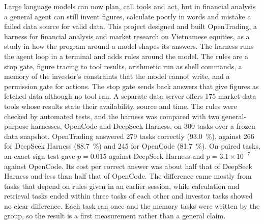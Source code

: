 Large language models can now plan, call tools and act, but in financial analysis a general agent can still invent figures, calculate poorly in words and mistake a failed data source for valid data.
This project designed and built OpenTrading, a harness for financial analysis and market research on Vietnamese equities, as a study in how the program around a model shapes its answers.
The harness runs the agent loop in a terminal and adds rules around the model.
The rules are a stop gate, figure tracing to tool results, arithmetic run as shell commands, a memory of the investor's constraints that the model cannot write, and a permission gate for actions.
The stop gate sends back answers that give figures as fetched data although no tool ran.
A separate data server offers 175 market-data tools whose results state their availability, source and time.
The rules were checked by automated tests, and the harness was compared with two general-purpose harnesses, OpenCode and DeepSeek Harness, on 300 tasks over a frozen data snapshot.
OpenTrading answered 279 tasks correctly (\qty{93.0}{\percent}), against 266 for DeepSeek Harness (\qty{88.7}{\percent}) and 245 for OpenCode (\qty{81.7}{\percent}).
On paired tasks, an exact sign test gave $p=0.015$ against DeepSeek Harness and $p=3.1\times10^{-7}$ against OpenCode.
Its cost per correct answer was about half that of DeepSeek Harness and less than half that of OpenCode.
The difference came mostly from tasks that depend on rules given in an earlier session, while calculation and retrieval tasks ended within three tasks of each other and investor tasks showed no clear difference.
Each task ran once and the memory tasks were written by the group, so the result is a first measurement rather than a general claim.
